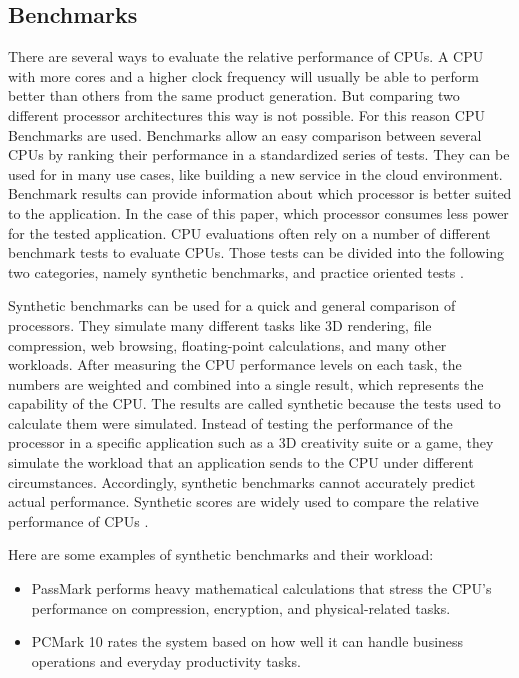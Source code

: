 \subsection{Benchmarks}
There are several ways to evaluate the relative performance of CPUs. 
A CPU with more cores and a higher clock frequency will usually be able to perform better 
than others from the same product generation.
But comparing two different processor architectures this way is not possible. 
For this reason CPU Benchmarks are used. 
Benchmarks allow an easy comparison between several CPUs by ranking their performance in a standardized series of tests. 
They can be used for in many use cases, like building a new service in the cloud environment. 
Benchmark results can provide information about which processor is better suited to the application. 
In the case of this paper, which processor consumes less power for the tested application. 
CPU evaluations often rely on a number of different benchmark tests to evaluate CPUs.
Those tests can be divided into the following two categories, namely synthetic benchmarks, and practice oriented tests
\cite{Thebench76:online}.

Synthetic benchmarks can be used for a quick and general comparison of processors. 
They simulate many different tasks like  
3D rendering, file compression, web browsing, floating-point calculations, and many other workloads. 
After measuring the CPU performance levels on each task, the numbers are weighted and combined into a single result, 
which represents the capability of the CPU.
The results are called synthetic because the tests used to calculate them were simulated. 
Instead of testing the performance of the processor in a specific application such as a 3D creativity suite or a game, 
they simulate the workload that an application sends to the CPU under different circumstances.
Accordingly, synthetic benchmarks cannot accurately predict actual performance. 
Synthetic scores are widely used to compare the relative performance of CPUs 
\cite{Microsof4:online}.

Here are some examples of synthetic benchmarks and their workload:
\begin{itemize}
\item PassMark performs heavy mathematical calculations that stress the CPU's performance on compression, encryption, and physical-related tasks.
\item PCMark 10 rates the system based on how well it can handle business operations and everyday productivity tasks.
\end{itemize} 


